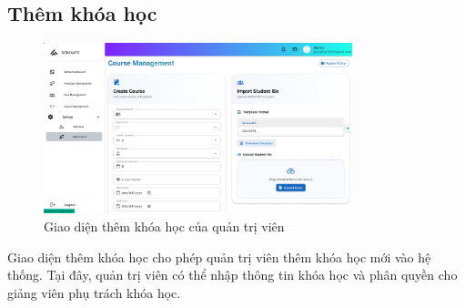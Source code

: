 \subsection{Thêm khóa học}
\begin{figure}[H]
    \centering
    \includegraphics[width=0.8\textwidth]{images/CapScreen_Admin/addcourse.png}
    \caption{Giao diện thêm khóa học của quản trị viên}
    \label{fig:admin_add_course_page}
\end{figure}
Giao diện thêm khóa học cho phép quản trị viên thêm khóa học mới vào hệ thống. Tại đây, quản trị viên có thể nhập thông tin khóa học và phân quyền cho giảng viên phụ trách khóa học. 